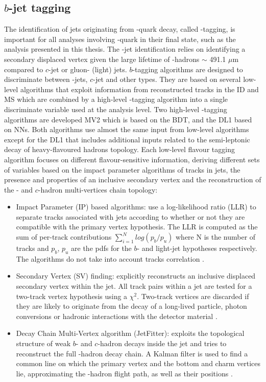 \subsection{$b$-jet tagging}
\label{Jet:Tag:Dlr}
The identification of jets originating from \bq-quark decay, called \bq-tagging, is important for all analyses involving \bq-quark in their final state, such as the  \HHyybb analysis presented in this thesis. The \bq-jet identification relies on identifying a secondary displaced vertex given the large lifetime of \bq-hadrons $\sim$ 491.1 $\mu$m compared to $c$-jet or gluon- (light) jets. $b$-tagging algorithms are designed to discriminate between \bq-jets, $c$-jet and other types. They are based on several low-level algorithms that exploit information from reconstructed tracks in the ID and MS which are combined by a high-level \bq-tagging algorithm into a single discriminate variable used at the analysis level. Two high-level \bq-tagging algorithms are developed MV2 which is based on the BDT, and the DL1 based on NNs. Both algorithms use almost the same input from low-level algorithms except for the DL1 that includes additional inputs related to the semi-leptonic decay of heavy-flavoured hadrons topology. Each low-level flavour tagging algorithm focuses on different flavour-sensitive information, deriving different sets of variables based on the impact parameter algorithms of tracks in jets, the presence and properties of an inclusive secondary vertex and the reconstruction of the \bq- and $c$-hadron multi-vertices chain topology:
\begin{itemize}
    \item Impact Parameter (IP) based algorithms: use a log-likelihood ratio (LLR) to separate tracks associated with jets according to whether or not they are compatible with the primary vertex hypothesis. The LLR is computed as the sum of per-track contributions $\sum_{i=1}^{N}log(p_b/p_u)$ where N is the number of tracks and $p_b$, $p_u$ are the pdfs for the $b$- and light-jet hypotheses respectively. The algorithms do not take into account tracks correlation \cite{IP,IP2}. 
    \item Secondary Vertex (SV) finding: explicitly reconstructs an inclusive displaced secondary vertex within the jet. All track pairs within a jet are tested for a two-track vertex hypothesis using a $\chi^2$. Two-track vertices are discarded if they are likely to originate from the decay of a long-lived particle, photon conversions or hadronic interactions with the detector material \cite{SV}.
    \item Decay Chain Multi-Vertex algorithm (JetFitter): exploits the topological structure of weak $b$- and $c$-hadron decays inside the jet and tries to reconstruct the full \bq-hadron decay chain. A Kalman filter is used to find a common line on which the primary vertex and the bottom and charm vertices lie, approximating the \bq-hadron flight path, as well as their positions \cite{JetFitter}.
\end{itemize}
